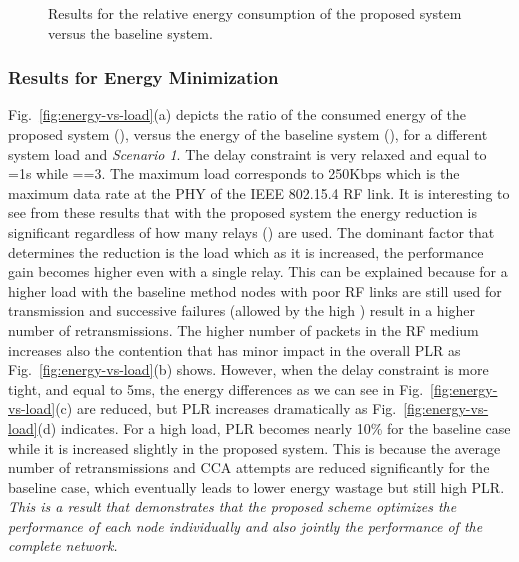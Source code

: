 \documentclass[10pt]{IEEEtran}
\newcounter{section:outage-analysis}
\begin{document}
\begin{figure}[t]
\begin{center}
\caption{Results for the relative energy consumption of the proposed system versus the baseline system.}
\label{fig:energy-vs-snr}
\end{center}
\end{figure}

\subsubsection{Results for Energy Minimization}
Fig.~\ref{fig:energy-vs-load}(a) depicts the ratio of the consumed energy of the proposed system (), versus the energy of the baseline system (), for a different system load  and \emph{Scenario 1}. The delay constraint is very relaxed and equal to =1s while ==3. The maximum load corresponds to 250Kbps which is the maximum data rate at the PHY of the IEEE 802.15.4 RF link. It is interesting to see from these results that with the proposed system the energy reduction is significant regardless of how many relays () are used. The dominant factor that determines the reduction is the load which as it is increased, the performance gain becomes higher even with a single relay. This can be explained because for a higher load with the baseline method nodes with poor RF links are still used for transmission and successive failures (allowed by the high ) result in a higher number of retransmissions. The higher number of packets in the RF medium increases also the contention that has minor impact in the overall PLR as Fig.~\ref{fig:energy-vs-load}(b) shows. However, when the delay constraint is more tight, and equal to 5ms, the energy differences as we can see in Fig.~\ref{fig:energy-vs-load}(c) are reduced, but PLR increases dramatically as Fig.~\ref{fig:energy-vs-load}(d) indicates. For a high load, PLR becomes nearly 10\% for the baseline case while it is increased slightly in the proposed system. This is because the average number of retransmissions and CCA attempts are reduced significantly for the baseline case, which eventually leads to lower energy wastage but still high PLR. \emph{This is a result that demonstrates  that the proposed scheme optimizes the performance of each node individually and also jointly the performance of the complete network.}
\end{document}
